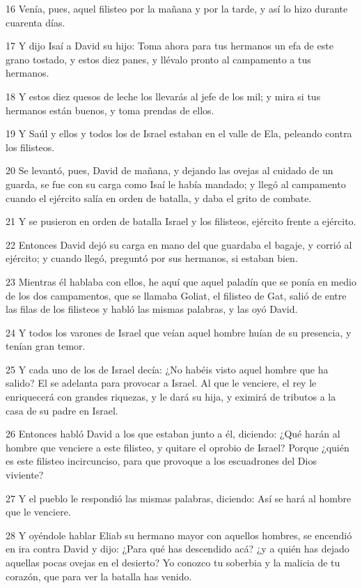 \par 16 Venía, pues, aquel filisteo por la mañana y por la tarde, y así lo hizo durante cuarenta días.
\par 17 Y dijo Isaí a David su hijo: Toma ahora para tus hermanos un efa   de este grano tostado, y estos diez panes, y llévalo pronto al campamento a tus hermanos.
\par 18 Y estos diez quesos de leche los llevarás al jefe de los mil; y mira si tus hermanos están buenos, y toma prendas de ellos.
\par 19 Y Saúl y ellos y todos los de Israel estaban en el valle de Ela, peleando contra los filisteos.
\par 20 Se levantó, pues, David de mañana, y dejando las ovejas al cuidado de un guarda, se fue con su carga como Isaí le había mandado; y llegó al campamento cuando el ejército salía en orden de batalla, y daba el grito de combate.
\par 21 Y se pusieron en orden de batalla Israel y los filisteos, ejército frente a ejército.
\par 22 Entonces David dejó su carga en mano del que guardaba el bagaje, y corrió al ejército; y cuando llegó, preguntó por sus hermanos, si estaban bien.
\par 23 Mientras él hablaba con ellos, he aquí que aquel paladín que se ponía en medio de los dos campamentos, que se llamaba Goliat, el filisteo de Gat, salió de entre las filas de los filisteos y habló las mismas palabras, y las oyó David.
\par 24 Y todos los varones de Israel que veían aquel hombre huían de su presencia, y tenían gran temor.
\par 25 Y cada uno de los de Israel decía: ¿No habéis visto aquel hombre que ha salido? El se adelanta para provocar a Israel. Al que le venciere, el rey le enriquecerá con grandes riquezas, y le dará su hija, y eximirá de tributos a la casa de su padre en Israel.
\par 26 Entonces habló David a los que estaban junto a él, diciendo: ¿Qué harán al hombre que venciere a este filisteo, y quitare el oprobio de Israel? Porque ¿quién es este filisteo incircunciso, para que provoque a los escuadrones del Dios viviente? 
\par 27 Y el pueblo le respondió las mismas palabras, diciendo: Así se hará al hombre que le venciere.
\par 28 Y oyéndole hablar Eliab su hermano mayor con aquellos hombres, se encendió en ira contra David y dijo: ¿Para qué has descendido acá? ¿y a quién has dejado aquellas pocas ovejas en el desierto? Yo conozco tu soberbia y la malicia de tu corazón, que para ver la batalla has venido.
